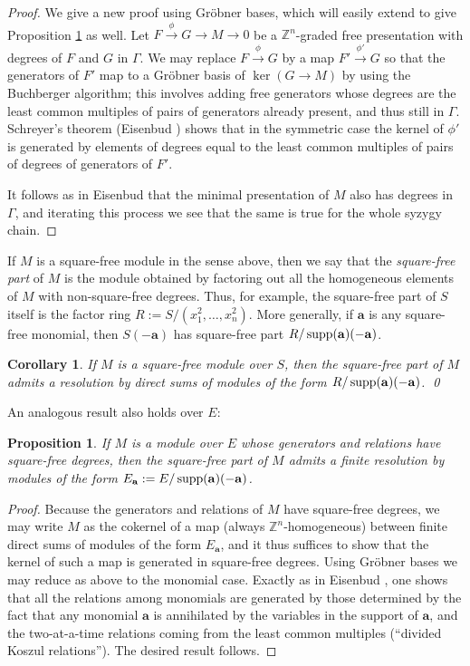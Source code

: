 \documentclass{tran-l}
\newtheorem{proposition}[theorem]{Proposition}
\newtheorem{corollary}[theorem]{Corollary}
\theoremstyle{definition}
\theoremstyle{remark}
\newcommand{\Z}{{\mathbb{Z}}}
\newcommand{\baa}{{\mathbf{a}}}
\newcommand{\supp}{\mathop{\rm supp}\nolimits}
\begin{document}
\begin{proof} 
We give a new proof using Gr\"obner bases, which will
easily extend to give Proposition \ref{sfbettisexterior} as well.
Let 
$F\xrightarrow{\phi} G\to M\to 0$
be a $\Z^n$-graded free presentation with degrees of $F$ and $G$ 
in $\Gamma$. 
\pagebreak
We may replace $F\xrightarrow{\phi} G$ by a map $F'\xrightarrow{\phi'} G$ 
so that the generators
of $F'$ map to a Gr\"obner basis of $\ker(G\to M)$ by using the Buchberger
algorithm; this involves adding free generators whose
degrees are the least common multiples of pairs of generators
already present, and thus still in $\Gamma$.
Schreyer's theorem 
(Eisenbud \cite[Theorem 15.10]{Ei}) shows that in the symmetric
case the
kernel of $\phi'$ is generated by elements of degrees equal
to the least common multiples of pairs of degrees of generators of $F'$.


It follows as in Eisenbud \cite[Theorem 20.2]{Ei} 
that the minimal presentation of $M$  also  has 
degrees in $\Gamma$, and iterating this process 
we see that the same is true for
the whole syzygy chain.
\end{proof}

If $M$ is a square-free module in the sense above, then
we say that the {\it square-free part\/} of $M$ is the 
module obtained by factoring out all the homogeneous elements
of $M$ with non-square-free degrees. Thus, for example,
the square-free part of $S$ itself is the factor ring
$R:=S/(x_1^2,\ldots,x_n^2)$.  More generally, if $\baa$ is
any square-free monomial, then
$S(-\baa)$ has square-free part $R/\supp(\baa)(-\baa)$. 

\begin{corollary}\label{sfparts} If $M$ is a square-free module over $S$,
then the square-free part of $M$ 
admits a resolution by direct sums of modules of the
form $R/\supp(\baa)(-\baa)$. 
\qed
\end{corollary}

An analogous result also holds over $E$:

\begin{proposition}\label{sfbettisexterior} If $M$ is a module over $E$ whose
generators and relations have square-free  degrees, 
then the square-free part of
$M$ admits a finite resolution by modules of the form 
$E_\baa:= E/\supp(\baa)(-\baa)$.\end{proposition}

\begin{proof} Because the generators and relations of $M$ have square-free degrees,
we may write $M$ as the cokernel of a map (always $\Z^n$-homogeneous)
between finite direct sums of modules of the form $E_\baa$, and it thus
suffices to show that the kernel of such a map is generated in
square-free degrees. Using Gr\"obner bases we may reduce as above to
the monomial case. Exactly as in Eisenbud \cite[Lemma 15.1]{Ei}, one
shows that all the relations among monomials are generated by those
determined by the fact that any monomial $\baa$ is annihilated by the
variables in the support of $\baa$, and the two-at-a-time relations
coming from the least common multiples (``divided Koszul
relations''). The desired result follows.\end{proof}
\end{document}
